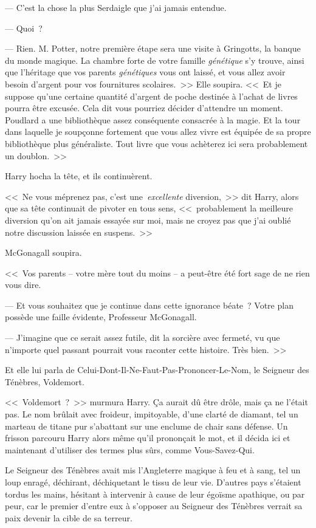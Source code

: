 --- C'est la chose la plus Serdaigle que j'ai jamais entendue.

--- Quoi~?

--- Rien. M. Potter, notre première étape sera une visite à Gringotts, la banque du monde magique. La chambre forte de votre famille \emph{génétique} s'y trouve, ainsi que l'héritage que vos parents \emph{génétiques} vous ont laissé, et vous allez avoir besoin d'argent pour vos fournitures scolaires.~>> Elle soupira. <<~Et je suppose qu'une certaine quantité d'argent de poche destinée à l'achat de livres pourra être excusée. Cela dit vous pourriez décider d'attendre un moment. Poudlard a une bibliothèque assez conséquente consacrée à la magie. Et la tour dans laquelle je soupçonne fortement que vous allez vivre est équipée de sa propre bibliothèque plus généraliste. Tout livre que vous achèterez ici sera probablement un doublon.~>>

Harry hocha la tête, et ils continuèrent.

<<~Ne vous méprenez pas, c'est une~\emph{excellente} diversion,~>> dit Harry, alors que sa tête continuait de pivoter en tous sens, <<~probablement la meilleure diversion qu'on ait jamais essayée sur moi, mais ne croyez pas que j'ai oublié notre discussion laissée en suspens.~>>

McGonagall soupira.

<<~Vos parents -- votre mère tout du moins -- a peut-être été fort sage de ne rien vous dire.

--- Et vous souhaitez que je continue dans cette ignorance béate~? Votre plan possède une faille évidente, Professeur McGonagall.

--- J'imagine que ce serait assez futile, dit la sorcière avec fermeté, vu que n'importe quel passant pourrait vous raconter cette histoire. Très bien.~>>

Et elle lui parla de Celui-Dont-Il-Ne-Faut-Pas-Prononcer-Le-Nom, le Seigneur des Ténèbres, Voldemort.

<<~Voldemort~?~>> murmura Harry. Ça aurait dû être drôle, mais ça ne l'était pas. Le nom brûlait avec froideur, impitoyable, d'une clarté de diamant, tel un marteau de titane pur s'abattant sur une enclume de chair sans défense. Un frisson parcouru Harry alors même qu'il prononçait le mot, et il décida ici et maintenant d'utiliser des termes plus sûrs, comme Vous-Savez-Qui.

Le Seigneur des Ténèbres avait mis l'Angleterre magique à feu et à sang, tel un loup enragé, déchirant, déchiquetant le tissu de leur vie. D'autres pays s'étaient tordus les mains, hésitant à intervenir à cause de leur égoïsme apathique, ou par peur, car le premier d'entre eux à s'opposer au Seigneur des Ténèbres verrait sa paix devenir la cible de sa terreur.

